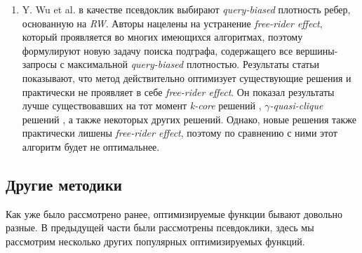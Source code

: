 \begin{enumerate}
  \item Y. Wu et al. \cite{Wu15} в качестве псевдоклик выбирают \textit{query-biased} плотность ребер, основанную на \textit{RW}. Авторы нацелены на устранение \textit{free-rider effect}, который проявляется во многих имеющихся алгоритмах, поэтому формулируют новую задачу поиска подграфа, содержащего все вершины-запросы с максимальной \textit{query-biased} плотностью. Результаты статьи показывают, что метод действительно оптимизует существующие решения и практически не проявляет в себе \textit{free-rider effect}. Он показал результаты лучше существовавших на тот момент \textit{k-core} решений \cite{Sozio10}, \textit{$\gamma$-quasi-clique} решений \cite{Zhu11}, а также некоторых других решений. Однако, новые решения \cite{Huang15, Barbieri15} также практически лишены \textit{free-rider effect}, поэтому по сравнению с ними этот алгоритм будет не оптимальнее.
\end{enumerate}

\subsection{Другие методики}

Как уже было рассмотрено ранее, оптимизируемые функции бывают довольно разные. В предыдущей части были рассмотрены псевдоклики, здесь мы рассмотрим несколько других популярных оптимизируемых функций.

